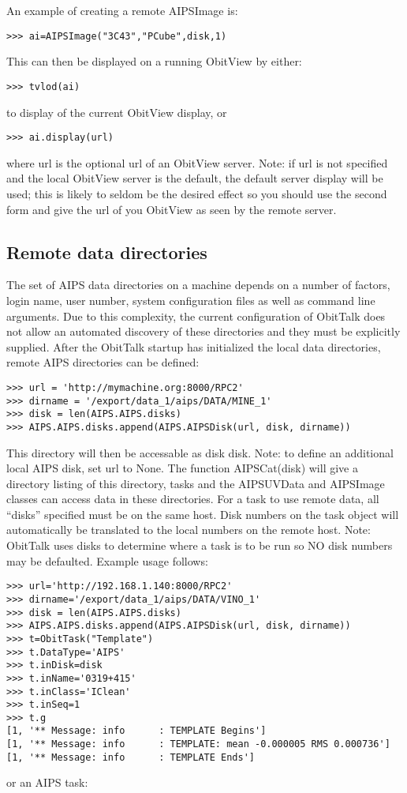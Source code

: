 \documentclass[11pt]{report}
\begin{document}
An example of creating a remote AIPSImage is:
\begin{verbatim}
>>> ai=AIPSImage("3C43","PCube",disk,1)
\end{verbatim}
This can then be displayed on a running ObitView by either:
\begin{verbatim}
>>> tvlod(ai)
\end{verbatim}
to display of the current ObitView display, or
\begin{verbatim}
>>> ai.display(url)
\end{verbatim}
where url is the optional url of an ObitView server.
Note: if url is not specified and the local ObitView 
server is the default, the default server display will be used;
this is likely to seldom be the desired effect so you should use the 
second form and give the url of you ObitView as seen by the  
remote server.

\subsection{Remote data directories}
The set of AIPS data directories on a machine depends on a number of
factors, login name, user number, system configuration files as well
as command line arguments.
Due to this complexity, the current configuration of ObitTalk does not
allow an automated discovery of these directories and they must be
explicitly supplied.
After the ObitTalk startup has initialized the local data directories,
remote AIPS directories can be defined:

\begin{verbatim}
>>> url = 'http://mymachine.org:8000/RPC2'
>>> dirname = '/export/data_1/aips/DATA/MINE_1'
>>> disk = len(AIPS.AIPS.disks)
>>> AIPS.AIPS.disks.append(AIPS.AIPSDisk(url, disk, dirname))
\end{verbatim}
This directory will then be accessable as disk disk.
Note: to define an additional local AIPS disk, set url to None.
The function AIPSCat(disk) will give a directory listing of this
directory, tasks and the AIPSUVData and AIPSImage classes can access
data in these directories.
For a task to use remote data, all ``disks'' specified must be on the
same host.
Disk numbers on the task object will automatically be translated to
the  local numbers on the remote host.
Note: ObitTalk uses disks to determine where a task is to be run so NO
disk numbers may be defaulted.
Example usage follows:
\begin{verbatim}
>>> url='http://192.168.1.140:8000/RPC2'
>>> dirname='/export/data_1/aips/DATA/VINO_1'
>>> disk = len(AIPS.AIPS.disks)
>>> AIPS.AIPS.disks.append(AIPS.AIPSDisk(url, disk, dirname))
>>> t=ObitTask("Template")
>>> t.DataType='AIPS'
>>> t.inDisk=disk
>>> t.inName='0319+415'
>>> t.inClass='IClean'
>>> t.inSeq=1
>>> t.g
[1, '** Message: info      : TEMPLATE Begins']
[1, '** Message: info      : TEMPLATE: mean -0.000005 RMS 0.000736']
[1, '** Message: info      : TEMPLATE Ends']
\end{verbatim}
or an AIPS task:
\end{document}
